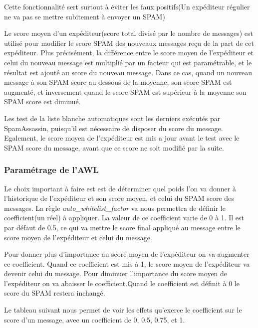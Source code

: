 \documentclass[a4paper,11pt]{article}
\begin{document}
Cette fonctionnalité sert surtout à éviter les faux positifs(Un expéditeur régulier ne va pas se mettre subitement à envoyer un SPAM)

Le score moyen d'un expéditeur(score total divisé par le nombre de messages) est utilisé pour modifier  
le score SPAM des nouveaux messages reçu de la part de cet expéditeur. Plus précisément, la différence entre le score 
moyen de l’expéditeur et celui du nouveau message est multiplié par un facteur qui est paramétrable,
et le résultat est ajouté au score du nouveau message. Dans ce cas, quand un nouveau message à son SPAM score 
au dessous de la moyenne, son score SPAM est augmenté, et inversement quand le score SPAM est supérieur à la moyenne
son SPAM score est diminué.

Les test de la liste blanche automatiques sont les derniers exécutés par SpamAssassin, puisqu'il est nécessaire de disposer du score du message.
Egalement, le score moyen de l'expéditeur est mis a jour avant le test avec le SPAM score du message, 
avant que ce score ne soit modifié par la suite.

\subsubsection{Paramétrage de l'AWL}
Le choix important à faire est est de déterminer quel poids l'on va donner à l'historique de l'expéditeur et son score moyen, et celui du SPAM score des messages.
La règle \emph{auto\_whitelist\_factor} va nous permettra de définir le coefficient(un réel) à appliquer. La valeur de ce coefficient 
varie de 0 à 1. Il est par défaut de 0.5, ce qui va mettre le score final appliqué au message entre le score moyen 
de l'expéditeur et celui du message. 

Pour donner plus d'importance au score moyen de l'expéditeur on va augmenter ce coefficient. Quand ce coefficient 
est mis à 1, le score moyen de l'expéditeur va devenir celui du message. Pour diminuer l'importance du score moyen de l'expéditeur 
on va abaisser le coefficient.Quand le coefficient est définit à 0 le score du SPAM restera inchangé. 
\linebreak[2]


Le tableau suivant nous permet de voir les effets qu'exerce le coefficient sur le score d'un message,
avec un coefficient de 0, 0.5, 0.75, et 1.
\end{document}
